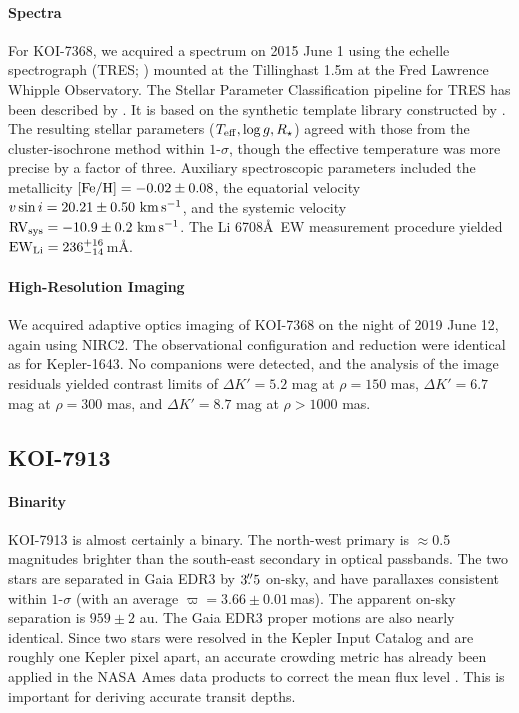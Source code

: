 \documentclass[12pt,twocolumn]{aastex63}
\newcommand{\mkms}{{\rm \,km\,s^{-1}}}  %
\begin{document}
\paragraph{Spectra}
For KOI-7368, we acquired a spectrum on 2015 June 1 using the echelle
spectrograph (TRES; \citealt{furesz_tres_2008}) mounted at the
Tillinghast 1.5m at the Fred Lawrence Whipple Observatory.  The
Stellar Parameter Classification pipeline for TRES has
been described by \citet{2021tsc2.confE.124B}.  It is based on the
synthetic template library constructed by
\citet{Buchhave2012}.  The resulting stellar parameters
($T_{\rm eff}, \log g, R_\star$) agreed with those from the
cluster-isochrone method within $1$-$\sigma$, though the effective
temperature was more precise by a factor of three.  Auxiliary
spectroscopic parameters included the metallicity $[{\rm Fe/H}]= -0.02
\pm 0.08$, the equatorial velocity $v\sin i = 20.21 \pm 0.50\,\mkms$,
and the systemic velocity ${\rm RV}_{\rm sys} = -10.9 \pm 0.2\,\mkms$.
The Li 6708\AA\ EW measurement procedure yielded ${\rm EW}_{\rm Li} =
236^{+16}_{-14}$\,m\AA.

\paragraph{High-Resolution Imaging}
We acquired adaptive optics imaging of KOI-7368 on the night of 2019
June 12, again using NIRC2.  The observational configuration and
reduction were identical as for Kepler-1643.  No companions were
detected, and the analysis of the image residuals yielded contrast
limits of $\Delta K' = 5.2$ mag at $\rho = 150$ mas, $\Delta K' = 6.7$
mag at $\rho = 300$ mas, and $\Delta K' = 8.7$ mag at $\rho > 1000$
mas.

\subsection{KOI-7913}

\paragraph{Binarity}
KOI-7913 is almost certainly a binary.  The north-west primary is
$\approx$0.5 magnitudes brighter than the south-east secondary in
optical passbands.  The two stars are separated in Gaia EDR3 by
$3\mbox{$.\!\!^{\prime\prime}$}5$ on-sky, and have parallaxes consistent within $1$-$\sigma$
(with an average $\varpi=3.66 \pm 0.01$\,mas).  The apparent on-sky
separation is $959 \pm 2$ au.  The Gaia EDR3 proper motions are also
nearly identical.  Since two stars were resolved in the Kepler Input
Catalog and are roughly one Kepler pixel apart, an accurate crowding
metric has already been applied in the NASA Ames data products to
correct the mean flux level \citep{2017ksci.rept....6M}.  This is
important for deriving accurate transit depths.
\end{document}
